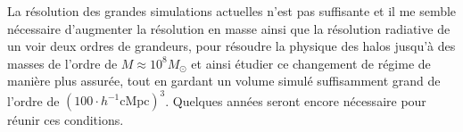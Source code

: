 La résolution des grandes simulations actuelles n'est pas suffisante et il me semble nécessaire d'augmenter la résolution en masse ainsi que la résolution radiative de un voir deux ordres de grandeurs, pour résoudre la physique des halos jusqu'à des masses de l'ordre de $M \approx 10^8M_\odot$ et ainsi étudier ce changement de régime de manière plus assurée, tout en gardant un volume simulé suffisamment grand de l'ordre de $\left( 100 \cdot h^{-1} \mathrm{cMpc} \right)^3$.
Quelques années seront encore nécessaire pour réunir ces conditions.







